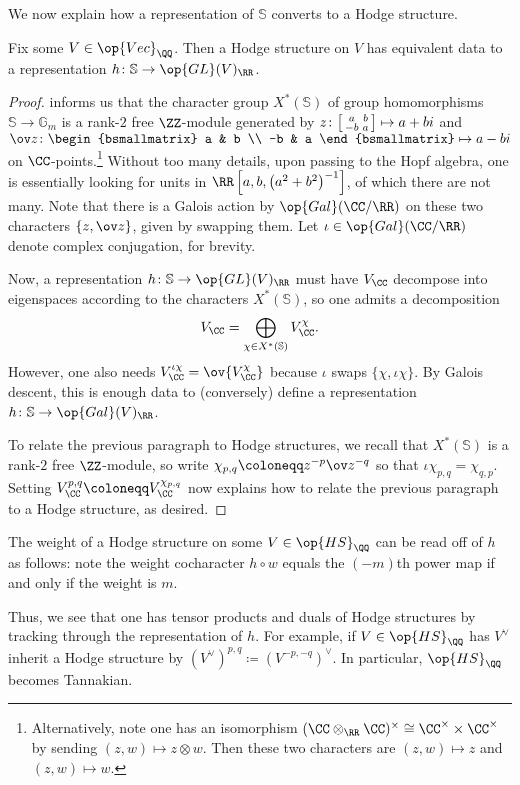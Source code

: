 \documentclass{article}
\begin{document}
We now explain how a representation of $\mathbb S$ converts to a Hodge structure.
\begin{lemma}
	Fix some $V\in\op{Vec}_\QQ$. Then a Hodge structure on $V$ has equivalent data to a representation $h\colon\mathbb S\to\op{GL}(V)_\RR$.
\end{lemma}
\begin{proof}
	 informs us that the character group $X^*(\mathbb S)$ of group homomorphisms $\mathbb S\to\mathbb G_m$ is a rank-$2$ free $\ZZ$-module generated by $z\colon\begin{bsmallmatrix}
		a & b \\ -b & a
	\end{bsmallmatrix}\mapsto a+bi$ and $\ov z\colon\begin{bsmallmatrix}
		a & b \\ -b & a
	\end{bsmallmatrix}\mapsto a-bi$ on $\CC$-points.\footnote{Alternatively, note one has an isomorphism $(\CC\otimes_\RR\CC)^\times\cong\CC^\times\times\CC^\times$ by sending $(z,w)\mapsto z\otimes w$. Then these two characters are $(z,w)\mapsto z$ and $(z,w)\mapsto w$.} Without too many details, upon passing to the Hopf algebra, one is essentially looking for units in $\RR\left[a,b,\left(a^2+b^2\right)^{-1}\right]$, of which there are not many. Note that there is a Galois action by $\op{Gal}(\CC/\RR)$ on these two characters $\{z,\ov z\}$, given by swapping them. Let $\iota\in\op{Gal}(\CC/\RR)$ denote complex conjugation, for brevity.

	Now, a representation $h\colon\mathbb S\to\op{GL}(V)_\RR$ must have $V_\CC$ decompose into eigenspaces according to the characters $X^*(\mathbb S)$, so one admits a decomposition
	\[V_\CC=\bigoplus_{\chi\in X^*(\mathbb S)}V_\CC^\chi.\]
	However, one also needs $V_\CC^{\iota\chi}=\ov{V_\CC^\chi}$ because $\iota$ swaps $\{\chi,\iota\chi\}$. By Galois descent, this is enough data to (conversely) define a representation $h\colon\mathbb S\to\op{Gal}(V)_\RR$.

	To relate the previous paragraph to Hodge structures, we recall that $X^*(\mathbb S)$ is a rank-$2$ free $\ZZ$-module, so write $\chi_{p,q}\coloneqq z^{-p}\ov z^{-q}$ so that $\iota\chi_{p,q}=\chi_{q,p}$. Setting $V_\CC^{p,q}\coloneqq V_\CC^{\chi_{p,q}}$ now explains how to relate the previous paragraph to a Hodge structure, as desired.
\end{proof}
\begin{remark}
	The weight of a Hodge structure on some $V\in\op{HS}_\QQ$ can be read off of $h$ as follows: note the weight cocharacter $h\circ w$ equals the $(-m)$th power map if and only if the weight is $m$. 
\end{remark}
Thus, we see that one has tensor products and duals of Hodge structures by tracking through the representation of $h$. For example, if $V\in\op{HS}_\QQ$ has $V^\lor$ inherit a Hodge structure by $(V^\lor)^{p,q}\coloneqq (V^{-p,-q})^\lor$. In particular, $\op{HS}_\QQ$ becomes Tannakian.\todo{}
\end{document}
